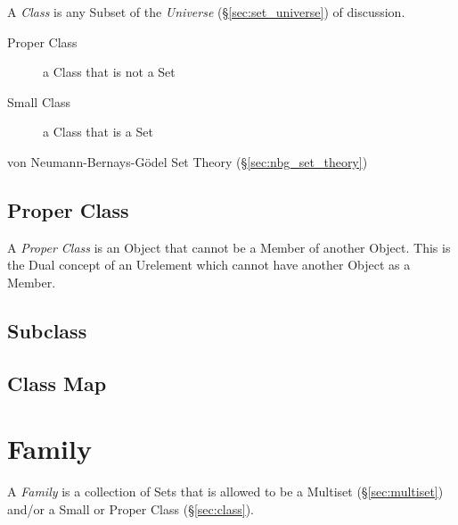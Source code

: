 A \emph{Class} is any Subset of the \emph{Universe} (\S\ref{sec:set_universe})
of discussion.

\begin{description}
  \item [Proper Class] a Class that is not a Set
  \item [Small Class] a Class that is a Set
\end{description}

\fist von Neumann-Bernays-G\"odel Set Theory (\S\ref{sec:nbg_set_theory})



\subsection{Proper Class}\label{sec:proper_class}

A \emph{Proper Class} is an Object that cannot be a Member of another Object.
This is the Dual concept of an Urelement which cannot have another Object as a
Member.



\subsection{Subclass}\label{sec:subclass}

\subsection{Class Map}\label{sec:class_map}



\section{Family}\label{sec:family}

A \emph{Family} is a collection of Sets that is allowed to be a Multiset
(\S\ref{sec:multiset}) and/or a Small or Proper Class (\S\ref{sec:class}).

